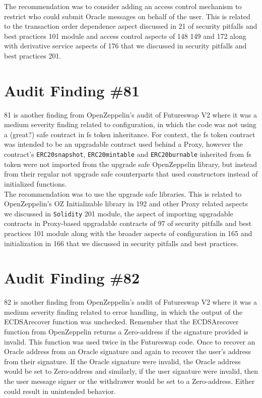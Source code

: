 The recommendation was to consider adding an access control mechanism to restrict who could submit Oracle messages on behalf of the user. This is related to the transaction order dependence aspect discussed in 21 of security pitfalls and best practices 101 module and access control aspects of 148 149 and 172 along with derivative service aspects of 176 that we discussed in security pitfalls and best practices 201.

\section{Audit Finding \#81}

81 is another finding from OpenZeppelin's audit of Futureswap V2 where it was a medium severity finding related to configuration, in which the code was not using a (great?) safe contract in fs token inheritance. For context, the fs token contract was intended to be an upgradable contract used behind a Proxy, however the contract's \verb|ERC20snapshot|, \verb|ERC20mintable| and \verb|ERC20burnable| inherited from fs token were not imported from the upgrade safe OpenZeppelin library, but instead from their regular not upgrade safe counterparts that used constructors instead of initialized functions.\\

The recommendation was to use the upgrade safe libraries. This is related to OpenZeppelin's OZ Initializable library in 192 and other Proxy related aspects we discussed in \verb|Solidity| 201 module, the aspect of importing upgradable contracts in Proxy-based upgradable contracts of 97 of security pitfalls and best practices 101 module along with the broader aspects of configuration in 165 and initialization in 166 that we discussed in security pitfalls and best practices.

\section{Audit Finding \#82}

82 is another finding from OpenZeppelin's audit of Futureswap V2 where it was a medium severity finding related to error handling, in which the output of the ECDSArecover function was unchecked. Remember that the ECDSArecover function from OpenZeppelin returns a Zero-address if the signature provided is invalid. This function was used twice in the Futureswap code. Once to recover an Oracle address from an Oracle signature and again to recover the user's address from their signature. If the Oracle signature were invalid, the Oracle address would be set to Zero-address and similarly, if the user signature were invalid, then the user message signer or the withdrawer would be set to a Zero-address. Either could result in unintended behavior.\\

